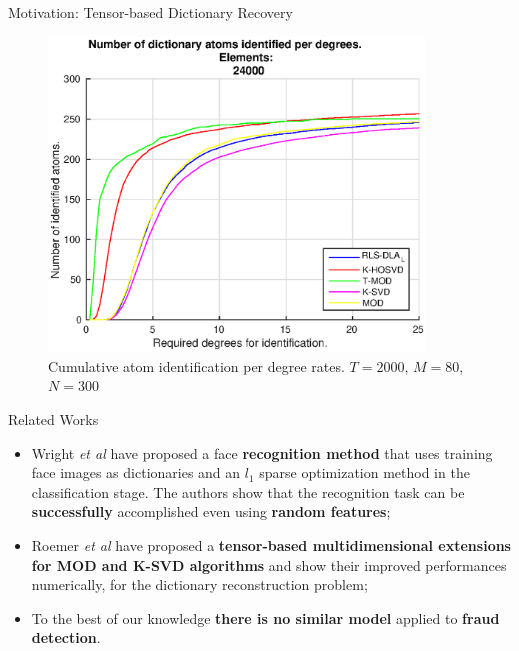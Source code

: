 \documentclass[newPxFont, numfooter, sectionpages]{beamer}
\begin{document}
\begin{frame}[c]{Motivation: Tensor-based Dictionary Recovery}
	\begin{figure}[!htb]
		\centering 
		\includegraphics[width=10cm]{../figures/ch4/5_20_2000_24000_100.eps}
		\caption{Cumulative atom identification per degree rates. $T=2000$, $M=80$, $N=300$}
		\label{fig:fig2}
	\end{figure}
\end{frame}
\begin{frame}[c]{Related Works}

	\begin{itemize}
		\item Wright \emph{et al} \cite{wright2009robust} have proposed a face \textbf{recognition method} that uses training face images as dictionaries and an $l_1$ sparse optimization method in the classification stage. The authors show that the recognition task can be \textbf{successfully} accomplished even using \textbf{random features};
		\item Roemer \emph{et al} \cite{roemer2014tensor} have proposed a \textbf{tensor-based multidimensional extensions for MOD and K-SVD algorithms} and show their improved performances numerically, for the dictionary reconstruction problem;
		\item To the best of our knowledge \textbf{there is no similar model} applied to \textbf{fraud detection}.
	\end{itemize}

\end{frame}
\end{document}
